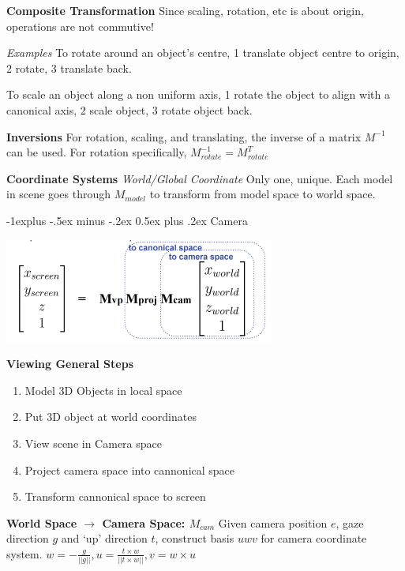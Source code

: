 \documentclass[letterpaper, 8pt]{extarticle}
\makeatletter
\renewcommand{\section}{\@startsection{section}{1}{0mm}%
                                {-1explus -.5ex minus -.2ex}%
                                {0.5ex plus .2ex}%
                                {\normalfont\normalsize\bfseries}}
\makeatother
\begin{document}
\begin{multicols*}{4}
\textbf{Composite Transformation}
Since scaling, rotation, etc is about origin, operations are not commutive!

\textit{Examples}
To rotate around an object's centre, 1 translate object centre to origin, 2 rotate, 3 translate back.

To scale an object along a non uniform axis, 1 rotate the object to align with a canonical axis, 2 scale object, 3 rotate object back.

\textbf{Inversions}
For rotation, scaling, and translating,
the inverse of a matrix \(M^{-1}\) can be used.
For rotation specifically, \(M^{-1}_{rotate}=M^T_{rotate}\)

\textbf{Coordinate Systems}
\textit{World/Global Coordinate}
Only one, unique.
Each model in scene goes through \(M_{model}\) to transform from model space to world space.

\section{Camera}

\includegraphics[width=\linewidth]{cam-total.png}

\textbf{Viewing General Steps}
\begin{enumerate}
    \item Model 3D Objects in local space
    \item Put 3D object at world coordinates
    \item View scene in Camera space
    \item Project camera space into cannonical space
    \item Transform cannonical space to screen
\end{enumerate}

\textbf{World Space $\to$ Camera Space: $M_{cam}$}
Given camera position $e$, gaze direction $g$ and `up' direction $t$, construct basis $uwv$ for camera coordinate system.
$w = - \frac{g}{||g||}, u = \frac{t \times w}{||t \times w||}, v = w \times u$ 


\end{multicols*}
\end{document}
